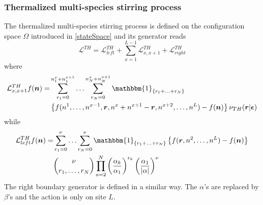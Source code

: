\documentclass[10pt]{article}
\numberwithin{equation}{section}
\numberwithin{equation}{subsection}
\begin{document}
\subsubsection{Thermalized multi-species stirring process}
The thermalized multi-species stirring process is defined on the configuration space $\Omega$ introduced in \eqref{stateSpace} and its generator reads
\begin{equation}\label{thermalizedGenerator}
	\mathcal{L}^{TH}=\mathcal{L}_{left}^{TH}+\sum_{x=1}^{L-1}\mathcal{L}_{x,x+1}^{TH}+\mathcal{L}_{right}^{TH}
\end{equation}
where 
\begin{equation}\label{bulkThermalized}
	\begin{split}
	\mathcal{L}_{x,x+1}^{TH}f(\bm{n})=&\sum_{r_{1}=0}^{n_{1}^{x}+n_{1}^{x+1}}\ldots\sum_{r_{N}=0}^{n_{N}^{x}+n_{N}^{x+1}}\mathbbm{1}_{\{r_{1}+\ldots+r_{N}\}}
	\\&
	\left\{f(n^{1},\ldots,n^{x-1},\bm{r},n^{x}+n^{x+1}-\bm{r},n^{x+2},\ldots,n^{L})-f(\bm{n})\right\}\nu_{TH}(\bm{r}|\bm{\epsilon})
	\end{split}
\end{equation}
while
\begin{equation}\label{boundaryThermalized}
	\begin{split}
		\mathcal{L}_{left}^{TH}f(\bm{n})=&\sum_{r_{1}=0}^{\nu}\ldots\sum_{r_{N}=0}^{\nu}\mathbbm{1}_{\{r_{1}+\ldots+r_{N}\}}\left\{f(\bm{r},n^{2},\ldots,n^{L})-f(\bm{n})\right\}\\&
		\binom{\nu}{r_{1},\ldots, r_{N}}\prod_{a=2}^{N}\left(\frac{\alpha_{k}}{\alpha_{1}}\right)^{r_{k}}\left(\frac{\alpha_{1}}{|\alpha|}\right)^{\nu}
		\end{split}
	\end{equation}
The right boundary generator is defined in a similar way. The $\alpha$'s are replaced by $\beta$'s and the action is only on site $L$. 
\end{document}
